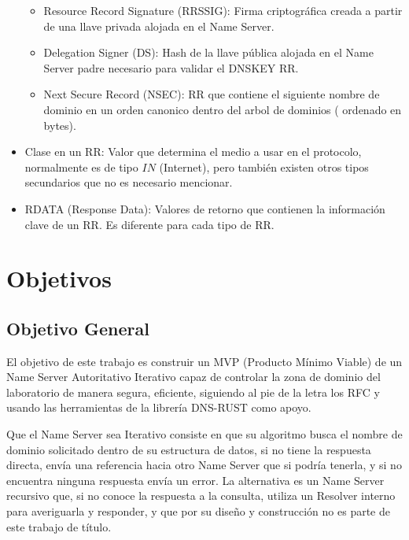 \begin{itemize}
\begin{itemize}
            \item  Resource Record Signature (RRSSIG): Firma criptográfica creada a partir de una llave privada alojada en el Name Server.
            \item Delegation Signer (DS): Hash de la llave pública alojada en el Name Server padre necesario para validar el DNSKEY RR.
            \item Next Secure Record (NSEC): RR que contiene el siguiente nombre de dominio en un orden canonico dentro del arbol de dominios (
                ordenado en bytes).
        \end{itemize}
    \item Clase en un RR: Valor que determina el medio a usar en el protocolo, normalmente es de tipo $IN$ (Internet), pero también existen 
    otros tipos secundarios que no es necesario mencionar.
    \item RDATA (Response Data): Valores de retorno que contienen la información clave de un RR. Es diferente para cada tipo de RR.
\end{itemize}

\section{Objetivos}

\subsection*{Objetivo General}

El objetivo de este trabajo es construir un MVP (Producto Mínimo Viable) de un Name Server Autoritativo Iterativo capaz de controlar la zona de 
dominio del laboratorio de manera segura, eficiente, siguiendo al pie de la letra los RFC y usando las herramientas de la librería DNS-RUST como 
apoyo.

Que el Name Server sea Iterativo consiste en que su algoritmo busca el nombre de dominio solicitado dentro de su estructura de datos, si no 
tiene la respuesta directa, envía una referencia hacia otro Name Server que si podría tenerla, y si no encuentra ninguna respuesta envía un 
error. La alternativa es un Name Server recursivo que, si no conoce la respuesta a la consulta, utiliza un Resolver interno para averiguarla y 
responder, y que por su diseño y construcción no es parte de este trabajo de título.

